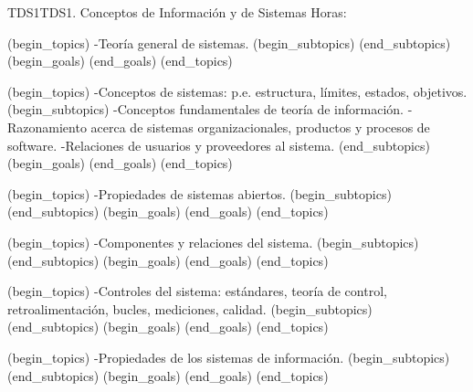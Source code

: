 \begin{BKL2}{TDS1}{TDS1. Conceptos de Información y de Sistemas}
Horas:
 
(begin_topics)
-Teoría general de sistemas.
(begin_subtopics)
(end_subtopics)
(begin_goals)
(end_goals)
(end_topics)

 
(begin_topics)
-Conceptos de sistemas: p.e. estructura, límites, estados, objetivos.
(begin_subtopics)
-Conceptos fundamentales de teoría de información.
-Razonamiento acerca de sistemas organizacionales, productos y procesos de software.
-Relaciones de usuarios y proveedores al sistema.
(end_subtopics)
(begin_goals)
(end_goals)
(end_topics)

 

(begin_topics)
-Propiedades de sistemas abiertos.
(begin_subtopics)
(end_subtopics)
(begin_goals)
(end_goals)
(end_topics)

 
(begin_topics)
-Componentes y relaciones del sistema.
(begin_subtopics)
(end_subtopics)
(begin_goals)
(end_goals)
(end_topics)

 
(begin_topics)
-Controles del sistema: estándares, teoría de control, retroalimentación, bucles, mediciones, calidad.
(begin_subtopics)
(end_subtopics)
(begin_goals)
(end_goals)
(end_topics)

 
(begin_topics)
-Propiedades de los sistemas de información.
(begin_subtopics)
(end_subtopics)
(begin_goals)
(end_goals)
(end_topics)

\end{BKL2}



